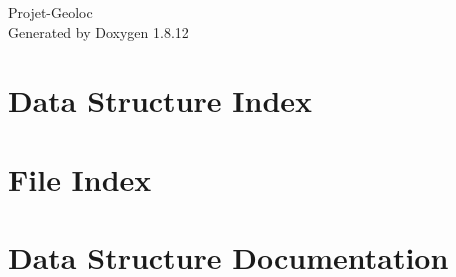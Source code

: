 \documentclass[twoside]{book}
\newcommand{\+}{\discretionary{\mbox{\scriptsize$\hookleftarrow$}}{}{}}
\newcommand{\clearemptydoublepage}{%
  \newpage{\pagestyle{empty}\cleardoublepage}%
}
\begin{document}
\hypersetup{pageanchor=false,
             bookmarksnumbered=true,
             pdfencoding=unicode
            }
\begin{titlepage}
\vspace*{7cm}
\begin{center}%
{\Large Projet-\/\+Geoloc }\\
\vspace*{1cm}
{\large Generated by Doxygen 1.8.12}\\
\end{center}
\end{titlepage}
\clearemptydoublepage
{}
\tableofcontents
\clearemptydoublepage
{}
\hypersetup{pageanchor=true}

\chapter{Data Structure Index}

\chapter{File Index}

\chapter{Data Structure Documentation}

































\end{document}
